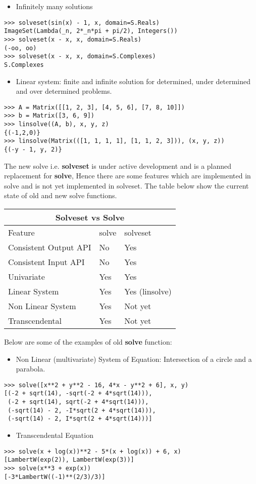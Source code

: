 \begin{itemize}
\item Infinitely many solutions
\end{itemize}
\begin{verbatim}
>>> solveset(sin(x) - 1, x, domain=S.Reals)
ImageSet(Lambda(_n, 2*_n*pi + pi/2), Integers())
>>> solveset(x - x, x, domain=S.Reals)
(-oo, oo)
>>> solveset(x - x, x, domain=S.Complexes)
S.Complexes
\end{verbatim}

\begin{itemize}
\item Linear system: finite and infinite solution for determined, under
determined and over determined problems.
\end{itemize}
\begin{verbatim}
>>> A = Matrix([[1, 2, 3], [4, 5, 6], [7, 8, 10]])
>>> b = Matrix([3, 6, 9])
>>> linsolve((A, b), x, y, z)
{(-1,2,0)}
>>> linsolve(Matrix(([1, 1, 1, 1], [1, 1, 2, 3])), (x, y, z))
{(-y - 1, y, 2)}
\end{verbatim}

The new solve i.e. \textbf{solveset} is under active development and is a
planned replacement for \textbf{solve}, Hence there are some features which are
implemented in solve and is not yet implemented in solveset. The table below
show the current state of old and new solve functions.

\hfill

\begin{tabular}{ |p{4cm}|p{3cm}|p{3cm}|  }
\hline
\multicolumn{3}{|c|}{Solveset vs Solve} \\
\hline
Feature& solve &solveset \\
\hline
Consistent Output API & No & Yes \\
Consistent Input API & No & Yes \\
Univariate & Yes & Yes\\
Linear System& Yes & Yes (linsolve) \\
Non Linear System& Yes & Not yet \\
Transcendental& Yes & Not yet \\
\hline
\end{tabular}

\hfill \break{}

Below are some of the examples of old \textbf{solve} function:

\begin{itemize}
\item Non Linear (multivariate) System of Equation: Intersection of a circle
and a parabola.
\end{itemize}
\begin{verbatim}
>>> solve([x**2 + y**2 - 16, 4*x - y**2 + 6], x, y)
[(-2 + sqrt(14), -sqrt(-2 + 4*sqrt(14))),
 (-2 + sqrt(14), sqrt(-2 + 4*sqrt(14))),
 (-sqrt(14) - 2, -I*sqrt(2 + 4*sqrt(14))),
 (-sqrt(14) - 2, I*sqrt(2 + 4*sqrt(14)))]
\end{verbatim}

\begin{itemize}
\item Transcendental Equation
\end{itemize}
\begin{verbatim}
>>> solve(x + log(x))**2 - 5*(x + log(x)) + 6, x)
[LambertW(exp(2)), LambertW(exp(3))]
>>> solve(x**3 + exp(x))
[-3*LambertW((-1)**(2/3)/3)]
\end{verbatim}
